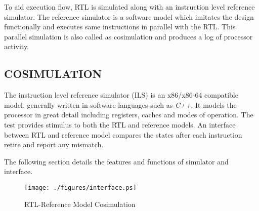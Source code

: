 To aid execution flow, RTL is simulated along with an instruction level reference simulator. The reference simulator is a software model which imitates the design functionally and executes same instructions in parallel with the RTL. This parallel simulation is also called as cosimulation and produces a log of processor activity.


\subsection {COSIMULATION}
The instruction level reference simulator (ILS)  is an x86/x86-64 compatible model, generally written in software languages such as {\it C++}. It models the processor in great detail including registers, caches and modes of operation. The test provides stimulus to both the RTL and reference models. An interface between RTL and reference model compares the states after each instruction retire and report any mismatch. 

The following section details the features and functions of simulator and interface. 



\begin{figure}[h]
\centering
\texttt{[image: ./figures/interface.ps]}
\caption{RTL-Reference Model Cosimulation} 
\label{fig:interface.ps}
\end{figure}





